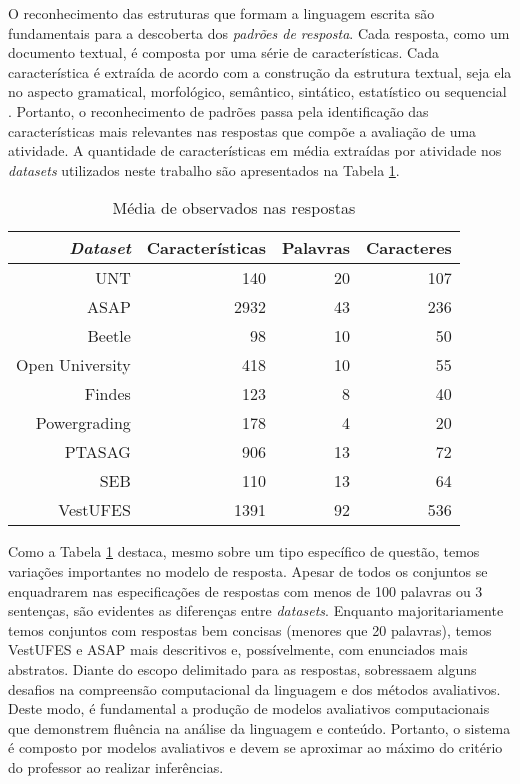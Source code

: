 O reconhecimento das estruturas que formam a linguagem escrita são fundamentais para a descoberta dos \textit{padrões de resposta}. Cada resposta, como um documento textual, é composta por uma série de características. Cada característica é extraída de acordo com a construção da estrutura textual, seja ela no aspecto gramatical, morfológico, semântico, sintático, estatístico ou sequencial \cite{kumar2019}. Portanto, o reconhecimento de padrões passa pela identificação das características mais relevantes nas respostas que compõe a avaliação de uma atividade. A quantidade de características em média extraídas por atividade nos \textit{datasets} utilizados neste trabalho são apresentados na  Tabela \ref{tab-features}.

\begin{table}
\centering
\caption{Média de observados nas respostas }
\label{tab-features}
\begin{tabular}{|r | r r r|} \hline
\textit{Dataset} & Características & Palavras & Caracteres \\
\hline
UNT & 140 & 20 & 107 \\
ASAP & 2932 & 43 & 236 \\
Beetle & 98 & 10 & 50 \\
Open University & 418 & 10 & 55 \\
Findes & 123 & 8 & 40 \\
Powergrading & 178 & 4 & 20 \\
PTASAG & 906 & 13 & 72 \\
SEB & 110 & 13 & 64 \\
VestUFES & 1391 & 92 & 536 \\
\hline \hline
\end{tabular}
\end{table}

Como a Tabela \ref{tab-features} destaca, mesmo sobre um tipo específico de questão, temos variações importantes no modelo de resposta. Apesar de todos os conjuntos se enquadrarem nas especificações de respostas com menos de 100 palavras ou 3 sentenças, são evidentes as diferenças entre \textit{datasets}. Enquanto majoritariamente temos conjuntos com respostas bem concisas (menores que 20 palavras), temos VestUFES e ASAP mais descritivos e, possívelmente, com enunciados mais abstratos. Diante do escopo delimitado para as respostas, sobressaem alguns desafios na compreensão computacional da linguagem e dos métodos avaliativos. Deste modo, é fundamental a produção de modelos avaliativos computacionais que demonstrem fluência na análise da linguagem e conteúdo. Portanto, o sistema é composto por modelos avaliativos e devem se aproximar ao máximo do critério do professor ao realizar inferências.

